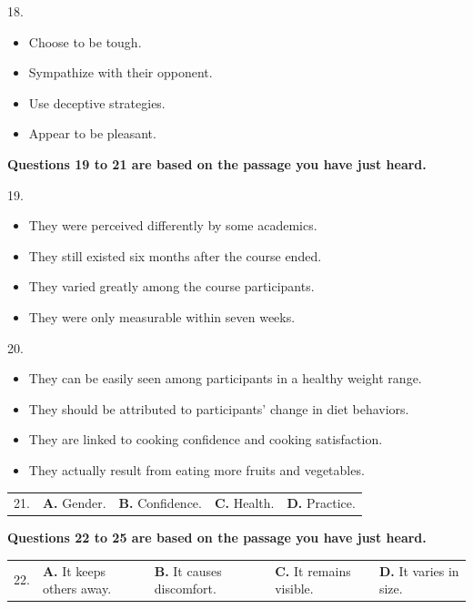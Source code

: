 \documentclass[UTF8,11pt]{ctexart}
\begin{document}
18.


\begin{itemize}[leftmargin=2em,itemsep=.2em,topsep=.4em]\item[A.] Choose to be tough.
\item[B.] Sympathize with their opponent.
\item[C.] Use deceptive strategies.
\item[D.] Appear to be pleasant.
\end{itemize}

\textbf{Questions 19 to 21 are based on the passage you have just heard.}


19.


\begin{itemize}[leftmargin=2em,itemsep=.2em,topsep=.4em]\item[A.] They were perceived differently by some academics.
\item[B.] They still existed six months after the course ended.
\item[C.] They varied greatly among the course participants.
\item[D.] They were only measurable within seven weeks.
\end{itemize}

20.


\begin{itemize}[leftmargin=2em,itemsep=.2em,topsep=.4em]\item[A.] They can be easily seen among participants in a healthy weight range.
\item[B.] They should be attributed to participants’ change in diet behaviors.
\item[C.] They are linked to cooking confidence and cooking satisfaction.
\item[D.] They actually result from eating more fruits and vegetables.
\end{itemize}

\noindent\begin{tabularx}{\linewidth}{@{}lXXXX@{}}21. & \textbf{A.} Gender. & \textbf{B.} Confidence. & \textbf{C.} Health. & \textbf{D.} Practice.\\\end{tabularx}\par

\textbf{Questions 22 to 25 are based on the passage you have just heard.}


\noindent\begin{tabularx}{\linewidth}{@{}lXXXX@{}}22. & \textbf{A.} It keeps others away. & \textbf{B.} It causes discomfort. & \textbf{C.} It remains visible. & \textbf{D.} It varies in size.\\\end{tabularx}\par
\end{document}
